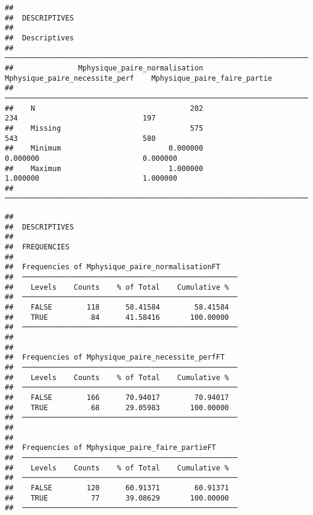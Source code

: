 \documentclass[
]{article}
\begin{document}
\begin{verbatim}
## 
##  DESCRIPTIVES
## 
##  Descriptives                                                                                                   
##  ────────────────────────────────────────────────────────────────────────────────────────────────────────────── 
##               Mphysique_paire_normalisation    Mphysique_paire_necessite_perf    Mphysique_paire_faire_partie   
##  ────────────────────────────────────────────────────────────────────────────────────────────────────────────── 
##    N                                    202                               234                             197   
##    Missing                              575                               543                             580   
##    Minimum                         0.000000                          0.000000                        0.000000   
##    Maximum                         1.000000                          1.000000                        1.000000   
##  ──────────────────────────────────────────────────────────────────────────────────────────────────────────────
\end{verbatim}

\begin{verbatim}
## 
##  DESCRIPTIVES
## 
##  FREQUENCIES
## 
##  Frequencies of Mphysique_paire_normalisationFT     
##  ────────────────────────────────────────────────── 
##    Levels    Counts    % of Total    Cumulative %   
##  ────────────────────────────────────────────────── 
##    FALSE        118      58.41584        58.41584   
##    TRUE          84      41.58416       100.00000   
##  ────────────────────────────────────────────────── 
## 
## 
##  Frequencies of Mphysique_paire_necessite_perfFT    
##  ────────────────────────────────────────────────── 
##    Levels    Counts    % of Total    Cumulative %   
##  ────────────────────────────────────────────────── 
##    FALSE        166      70.94017        70.94017   
##    TRUE          68      29.05983       100.00000   
##  ────────────────────────────────────────────────── 
## 
## 
##  Frequencies of Mphysique_paire_faire_partieFT      
##  ────────────────────────────────────────────────── 
##    Levels    Counts    % of Total    Cumulative %   
##  ────────────────────────────────────────────────── 
##    FALSE        120      60.91371        60.91371   
##    TRUE          77      39.08629       100.00000   
##  ──────────────────────────────────────────────────
\end{verbatim}
\end{document}

